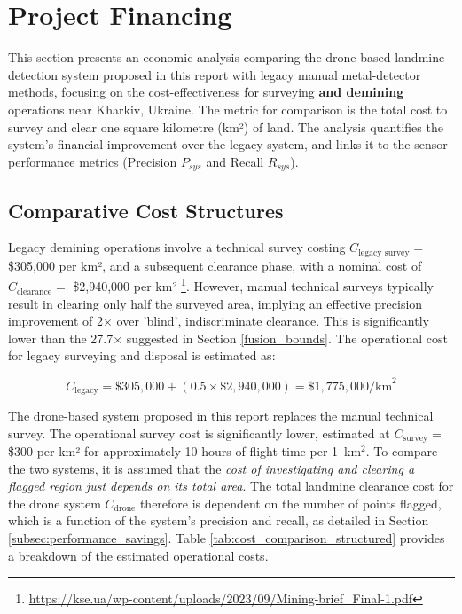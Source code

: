 \newpage
{}
\section{Project Financing} \label{financing}

This section presents an economic analysis comparing the drone-based landmine detection system proposed in this report with legacy manual metal-detector methods, focusing on the cost-effectiveness for surveying \textbf{and demining} operations near Kharkiv, Ukraine. The metric for comparison is the total cost to survey and clear one square kilometre (km²) of land. The analysis quantifies the system's financial improvement over the legacy system, and links it to the sensor performance metrics (Precision $P_{sys}$ and Recall $R_{sys}$).


\subsection{Comparative Cost Structures} \label{subsec:cost_structures}


Legacy demining operations involve a technical survey costing $C_\text{legacy survey}=$ \$305,000 per km², and a subsequent clearance phase, with a nominal cost of $C_\text{clearance}=$ \$2,940,000 per km² \footnote{\url{https://kse.ua/wp-content/uploads/2023/09/Mining-brief_Final-1.pdf}}. However, manual technical surveys typically result in clearing only half the surveyed area, implying an effective precision improvement of 2$\times$ over 'blind', indiscriminate clearance. This is significantly lower than the 27.7$\times$ suggested in Section \ref{fusion_bounds}. The operational cost for legacy surveying and disposal is estimated as:

\begin{equation*}
C_{\text{legacy}} = \$305,000 + (0.5 \times \$2,940,000) = \$1,775,000 \text{/km}^2 
\end{equation*}


The drone-based system proposed in this report replaces the manual technical survey. The operational survey cost is significantly lower, estimated at $C_\text{survey}=$ \$300 per km² for approximately 10 hours of flight time per 1~km$^2$. To compare the two systems, it is assumed that the \textit{cost of investigating and clearing a flagged region just depends on its total area}. The total landmine clearance cost for the drone system $C_{\text{drone}}$ therefore is dependent on the number of points flagged, which is a function of the system's precision and recall, as detailed in Section \ref{subsec:performance_savings}. Table \ref{tab:cost_comparison_structured} provides a breakdown of the estimated operational costs.

